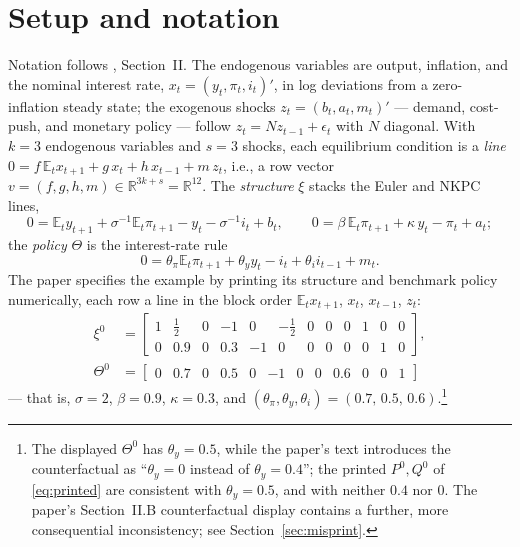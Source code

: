\documentclass[11pt]{article}
\theoremstyle{remark}
\newcommand{\E}{\mathbb{E}}
\newcommand{\R}{\mathbb{R}}
\begin{document}
\section{Setup and notation}\label{sec:setup}

Notation follows \citet{Beraja2023}, Section~II. The endogenous variables are output, inflation, and the nominal interest rate, $x_t=(y_t,\pi_t,i_t)'$, in log deviations from a zero-inflation steady state; the exogenous shocks $z_t=(b_t,a_t,m_t)'$ --- demand, cost-push, and monetary policy --- follow $z_t=Nz_{t-1}+\epsilon_t$ with $N$ diagonal. With $k=3$ endogenous variables and $s=3$ shocks, each equilibrium condition is a \emph{line} $0 = f\,\E_t x_{t+1} + g\,x_t + h\,x_{t-1} + m\,z_t$, i.e., a row vector $v=(f,g,h,m)\in\R^{3k+s}=\R^{12}$. The \emph{structure} $\xi$ stacks the Euler and NKPC lines,
\begin{equation*}
0=\E_ty_{t+1}+\sigma^{-1}\E_t\pi_{t+1}-y_t-\sigma^{-1}i_t+b_t , \qquad 0=\beta\,\E_t\pi_{t+1}+\kappa\,y_t-\pi_t+a_t ;
\end{equation*}
the \emph{policy} $\Theta$ is the interest-rate rule
\begin{equation*}
0=\theta_\pi \E_t\pi_{t+1}+\theta_y y_t - i_t + \theta_i i_{t-1} + m_t .
\end{equation*}
The paper specifies the example by printing its structure and benchmark policy numerically, each row a line in the block order $\E_tx_{t+1}$, $x_t$, $x_{t-1}$, $z_t$:
\begin{equation}\label{eq:xi0}
\begin{aligned}
\xi^0&=\begin{bmatrix} 1 & \tfrac12 & 0 & -1 & 0 & -\tfrac12 & 0 & 0 & 0 & 1 & 0 & 0\\
0 & 0.9 & 0 & 0.3 & -1 & 0 & 0 & 0 & 0 & 0 & 1 & 0
\end{bmatrix},\\
\Theta^0&=\begin{bmatrix} 0 & 0.7 & 0 & 0.5 & 0 & -1 & 0 & 0 & 0.6 & 0 & 0 & 1
\end{bmatrix}
\end{aligned}
\end{equation}
--- that is, $\sigma=2$, $\beta=0.9$, $\kappa=0.3$, and $(\theta_\pi,\theta_y,\theta_i)=(0.7,\,0.5,\,0.6)$.\footnote{The displayed $\Theta^0$ has $\theta_y=0.5$, while the paper's text introduces the counterfactual as ``$\theta_y=0$ instead of $\theta_y=0.4$''; the printed $P^0,Q^0$ of \eqref{eq:printed} are consistent with $\theta_y=0.5$, and with neither $0.4$ nor $0$. The paper's Section~II.B counterfactual display contains a further, more consequential inconsistency; see Section~\ref{sec:misprint}.}
\end{document}
